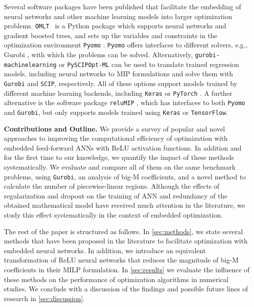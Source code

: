 Several software packages have been published that facilitate the embedding of neural networks and other machine learning models into larger optimization problems. \texttt{OMLT}~\citep{Ceccon2022} is a Python package which supports neural networks and gradient boosted trees, and sets up the variables and constraints in the optimization environment \texttt{Pyomo} \citep{Bynum2021,Hart2011}. \texttt{Pyomo} offers interfaces to different solvers, e.g., Gurobi \citep{gurobi}, with which the problems can be solved. Alternatively, \texttt{gurobi-machinelearning} or \texttt{PySCIPOpt-ML} \citep{Turner2024} can be used to translate trained regression models, including neural networks to MIP formulations and solve them with \texttt{Gurobi} and \texttt{SCIP}, respectively. All of these options support models trained by different machine learning backends, including \texttt{Keras} \citep{Chollet2015} or \texttt{PyTorch} \citep{PyTorch}. A further alternative is the software package \texttt{reluMIP} \citep{reluMIP2021}, which has interfaces to both \texttt{Pyomo} and \texttt{Gurobi}, but only supports models trained using \texttt{Keras} or \texttt{TensorFlow}.

\medskip
\noindent \textbf{Contributions and Outline.}
We provide a survey of popular and novel approaches to improving the computational efficiency of optimization with embedded feed-forward ANNs with ReLU activation functions.
In addition and for the first time to our knowledge, we quantify the impact of these methods systematically.
We evaluate and compare all of them on the same benchmark problems, using \texttt{Gurobi}, an analysis of big-M coefficients, and a novel method to calculate the number of piecewise-linear regions.
Although the effects of regularization and dropout on the training of ANN and redundancy of the obtained mathematical model have received much attention in the literature, we study this effect systematically in the context of embedded optimization.

The rest of the paper is structured as follows. In \cref{sec:methods}, we state several methods that have been proposed in the literature to facilitate optimization with embedded neural networks. In addition, we introduce an equivalent transformation of ReLU neural networks that reduces the magnitude of big-M coefficients in their MILP formulation. In \cref{sec:results} we evaluate the influence of these methods on the performance of optimization algorithms in numerical studies. We conclude with a discussion of the findings and possible future lines of research in \cref{sec:discussion}.